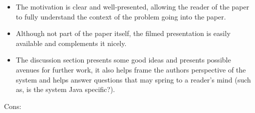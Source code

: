 \documentclass[11pt]{article}
\begin{document}
\begin{itemize}


    \item The motivation is clear and well-presented, allowing the reader of
    the paper to fully understand the context of the problem going into the
    paper.

    \item Although not part of the paper itself, the filmed presentation is
    easily available and complements it nicely.

    \item The discussion section presents some good ideas and presents possible
    avenues for further work, it also helps frame the authors perspective of
    the system and helps answer questions that may spring to a reader's mind
    (such as, is the system Java specific?).

\end{itemize}

Cons:
\end{document}

